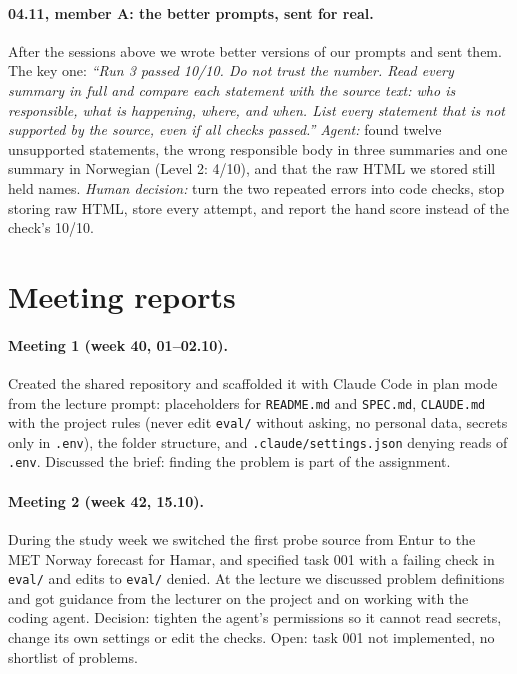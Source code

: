 \documentclass{article}
\begin{document}
\paragraph{04.11, member A: the better prompts, sent for real.} After the sessions above we wrote better
versions of our prompts and sent them. The key one: \emph{``Run 3 passed 10/10. Do not trust the
number. Read every summary in full and compare each statement with the source text: who is
responsible, what is happening, where, and when. List every statement that is not supported by the
source, even if all checks passed.''} \emph{Agent:} found twelve unsupported statements, the wrong
responsible body in three summaries and one summary in Norwegian (Level 2: 4/10), and that the raw
HTML we stored still held names. \emph{Human decision:} turn the two repeated errors into code checks,
stop storing raw HTML, store every attempt, and report the hand score instead of the check's 10/10.

\section{Meeting reports}

\paragraph{Meeting 1 (week 40, 01--02.10).} Created the shared repository and scaffolded it with
Claude Code in plan mode from the lecture prompt: placeholders for \texttt{README.md} and
\texttt{SPEC.md}, \texttt{CLAUDE.md} with the project rules (never edit \texttt{eval/} without
asking, no personal data, secrets only in \texttt{.env}), the folder structure, and
\texttt{.claude/settings.json} denying reads of \texttt{.env}. Discussed the brief: finding the
problem is part of the assignment.

\paragraph{Meeting 2 (week 42, 15.10).} During the study week we switched the first probe source
from Entur to the MET Norway forecast for Hamar, and specified task 001 with a failing check in
\texttt{eval/} and edits to \texttt{eval/} denied. At the lecture we discussed problem definitions
and got guidance from the lecturer on the project and on working with the coding agent. Decision:
tighten the agent's permissions so it cannot read secrets, change its own settings or edit the
checks. Open: task 001 not implemented, no shortlist of problems.
\end{document}
